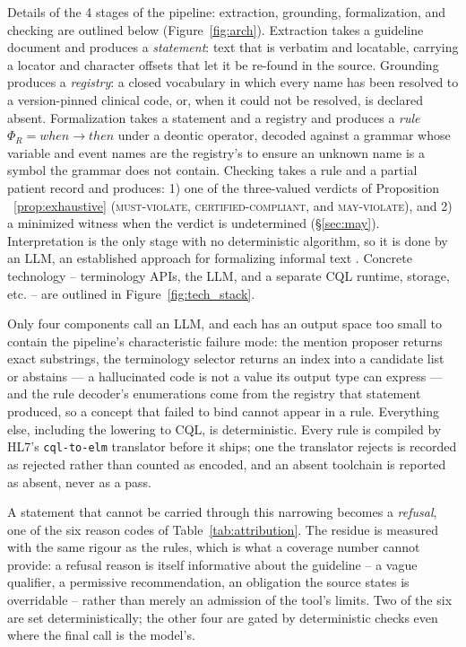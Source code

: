 \documentclass{article}
\begin{document}
Details of the 4 stages of the pipeline: extraction, grounding, formalization, and checking are outlined below (Figure~\ref{fig:arch}). Extraction takes a guideline document and produces a \emph{statement}: text that is verbatim and locatable, carrying a locator and character offsets that let it be re-found in the source. Grounding produces a \emph{registry}: a closed vocabulary in which every name has been resolved to a version-pinned clinical code, or, when it could not be resolved, is declared absent. Formalization takes a statement and a registry and produces a \emph{rule} $\Phi_R = \mathit{when} \rightarrow \mathit{then}$ under a deontic operator, decoded against a grammar whose variable and event names are the registry's to ensure an unknown name is a symbol the grammar does not contain. Checking takes a rule and a partial patient record and produces: 1) one of the three-valued verdicts of Proposition ~\ref{prop:exhaustive} (\textsc{must-violate}, \textsc{certified-compliant}, and \textsc{may-violate}), and 2) a minimized witness when the verdict is undetermined (\S\ref{sec:may}). Interpretation is the only stage with no deterministic algorithm, so it is done by an LLM, an established approach for formalizing informal text \citep{dsp}. Concrete technology -- terminology APIs, the LLM, and a separate CQL runtime, storage, etc. -- are outlined in Figure~\ref{fig:tech_stack}. 

Only four components call an LLM, and each has an output space too small to contain the pipeline's characteristic failure mode: the mention proposer returns exact substrings, the terminology selector returns an index into a candidate list or abstains --- a hallucinated code is not a value its output type can express --- and the rule decoder's enumerations come from the registry that statement produced, so a concept that failed to bind cannot appear in a rule. Everything else, including the lowering to CQL, is deterministic. Every rule is compiled by HL7's \texttt{cql-to-elm} translator before it ships; one the translator rejects is recorded as rejected rather than counted as encoded, and an absent toolchain is reported as absent, never as a pass.

A statement that cannot be carried through this narrowing becomes a \emph{refusal}, one of the six reason codes of Table~\ref{tab:attribution}. The residue is measured with the same rigour as the rules, which is what a coverage number cannot provide: a refusal reason is itself informative about the guideline -- a vague qualifier, a permissive recommendation, an obligation the source states is overridable -- rather than merely an admission of the tool's limits. Two of the six are set deterministically; the other four are gated by deterministic checks even where the final call is the model's.
\end{document}
